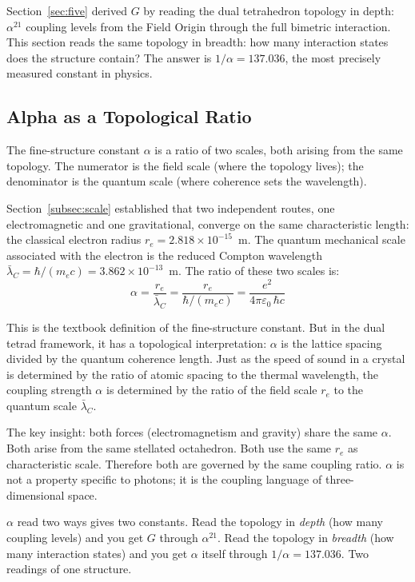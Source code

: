 \documentclass[aps,prd,preprint,superscriptaddress,showpacs,preprintnumbers,amsmath,amssymb,nofootinbib]{revtex4-2}
\begin{document}
Section~\ref{sec:five} derived $G$ by reading the dual tetrahedron topology in depth: $\alpha^{21}$ coupling levels from the Field Origin through the full bimetric interaction. This section reads the same topology in breadth: how many interaction states does the structure contain? The answer is $1/\alpha = 137.036$, the most precisely measured constant in physics.

\subsection{Alpha as a Topological Ratio}
\label{subsec:alpha-scale}

The fine-structure constant $\alpha$ is a ratio of two scales, both arising from the same topology. The numerator is the field scale (where the topology lives); the denominator is the quantum scale (where coherence sets the wavelength).

Section~\ref{subsec:scale} established that two independent routes, one electromagnetic and one gravitational, converge on the same characteristic length: the classical electron radius $r_e = 2.818 \times 10^{-15}$~m. The quantum mechanical scale associated with the electron is the reduced Compton wavelength $\bar{\lambda}_C = \hbar/(m_e c) = 3.862 \times 10^{-13}$~m. The ratio of these two scales is:
\begin{equation}
\alpha = \frac{r_e}{\bar{\lambda}_C} = \frac{r_e}{\hbar/(m_e c)} = \frac{e^2}{4\pi\varepsilon_0\,\hbar c}
\label{eq:alpha-ratio}
\end{equation}

This is the textbook definition of the fine-structure constant. But in the dual tetrad framework, it has a topological interpretation: $\alpha$ is the lattice spacing divided by the quantum coherence length. Just as the speed of sound in a crystal is determined by the ratio of atomic spacing to the thermal wavelength, the coupling strength $\alpha$ is determined by the ratio of the field scale $r_e$ to the quantum scale $\bar{\lambda}_C$.

The key insight: both forces (electromagnetism and gravity) share the same $\alpha$. Both arise from the same stellated octahedron. Both use the same $r_e$ as characteristic scale. Therefore both are governed by the same coupling ratio. $\alpha$ is not a property specific to photons; it is the coupling language of three-dimensional space.

$\alpha$ read two ways gives two constants. Read the topology in \emph{depth} (how many coupling levels) and you get $G$ through $\alpha^{21}$. Read the topology in \emph{breadth} (how many interaction states) and you get $\alpha$ itself through $1/\alpha = 137.036$. Two readings of one structure.
\end{document}
